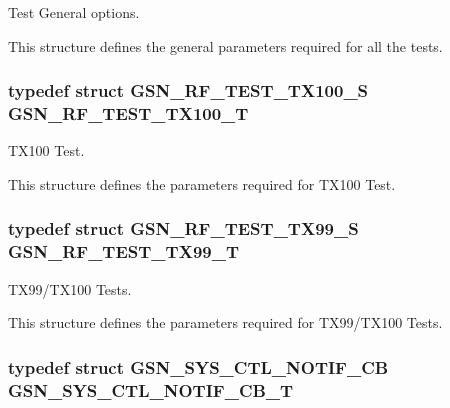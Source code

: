 Test General options. 

This structure defines the general parameters required for all the tests. \hypertarget{a00677_ga69f7ed019cbe7d83cfe2cc5446cdab1a}{
\subsubsection[{GSN\_\-RF\_\-TEST\_\-TX100\_\-T}]{\setlength{\rightskip}{0pt plus 5cm}typedef struct {\bf GSN\_\-RF\_\-TEST\_\-TX100\_\-S} {\bf GSN\_\-RF\_\-TEST\_\-TX100\_\-T}}}
\label{a00677_ga69f7ed019cbe7d83cfe2cc5446cdab1a}


TX100 Test. 

This structure defines the parameters required for TX100 Test. \hypertarget{a00677_gad6f744cc56ee1d2eefa8b1b733cacbe5}{
\subsubsection[{GSN\_\-RF\_\-TEST\_\-TX99\_\-T}]{\setlength{\rightskip}{0pt plus 5cm}typedef struct {\bf GSN\_\-RF\_\-TEST\_\-TX99\_\-S} {\bf GSN\_\-RF\_\-TEST\_\-TX99\_\-T}}}
\label{a00677_gad6f744cc56ee1d2eefa8b1b733cacbe5}


TX99/TX100 Tests. 

This structure defines the parameters required for TX99/TX100 Tests. \hypertarget{a00677_ga1afa369ae85e712e56f39e318e3dfb26}{
\subsubsection[{GSN\_\-SYS\_\-CTL\_\-NOTIF\_\-CB\_\-T}]{\setlength{\rightskip}{0pt plus 5cm}typedef struct {\bf GSN\_\-SYS\_\-CTL\_\-NOTIF\_\-CB} {\bf GSN\_\-SYS\_\-CTL\_\-NOTIF\_\-CB\_\-T}}}
\label{a00677_ga1afa369ae85e712e56f39e318e3dfb26}


